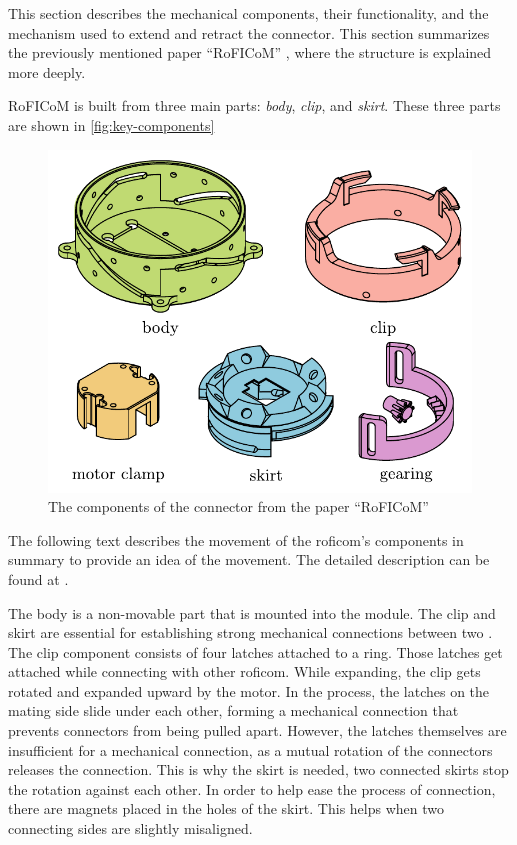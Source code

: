 \documentclass[
  digital,     %
  oneside,     %
  nosansbold,  %
  nocolorbold, %
  nolof,         %
  nolot,         %
]{fithesis4}
\begin{document}
This section describes the mechanical components, their functionality, and the mechanism used to extend and retract the connector. This section summarizes the previously mentioned paper ``RoFICoM'' \cite{MrazekBarnat2019Roficom}, where the structure is explained more deeply.

RoFICoM is built from three main parts: \emph{body}, \emph{clip}, and \emph{skirt}. These three parts are shown in \autoref{fig:key-components}

\begin{figure}[ht]
    \includegraphics{ dock_components.pdf }
    \caption{ The components of the connector from the paper ``RoFICoM'' \cite{MrazekBarnat2019Roficom} }
    \label{fig:key-components}
\end{figure}

The following text describes the movement of the \acrshort{roficom}'s components in summary to provide an idea of the movement. The detailed description can be found at \cite[p.~10--13]{Mrazek2019thesis}.

The body is a non-movable part that is mounted into the module.
The clip and skirt are essential for establishing strong mechanical connections between two .
The clip component consists of four latches attached to a ring. Those latches get attached while connecting with
other \acrshort{roficom}. While expanding, the clip gets rotated and expanded upward by the motor. In the process, the latches on the mating
side slide under each other, forming a mechanical connection that prevents connectors from being pulled apart.
However, the latches themselves are insufficient for a mechanical connection, as a mutual rotation of the connectors releases
the connection. This is why the skirt is needed, two connected skirts stop the rotation against each other. In order to help ease the process of connection, there are magnets placed in the holes of the skirt. This helps when two connecting sides are slightly misaligned.
\end{document}
